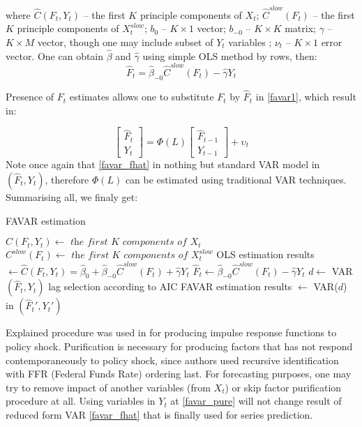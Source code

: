 \documentclass[a4paper, 14pt]{article}
\begin{document}
 \noindent where $\hat{C}(F_t, Y_t)$ -- the first $K$ principle components of $X_t$; $\hat{C}^{slow}(F_t)$ -- the first $K$ principle components of $X_t^{slow}$; $b_0$ -- $K \times 1$ vector; $b_{-0}$ -- $K \times K$ matrix; $\gamma$ -- $K \times M$ vector, though one may include subset of $Y_t$ variables  ; $\nu_t$ -- $K \times 1$ error vector. One can obtain $\hat{\beta}$ and $\hat{\gamma}$ using simple OLS method by rows, then: 
 \[\hat{F}_t = \hat{\beta}_{-0} \hat{C}^{slow}(F_t) - \hat{\gamma}Y_t      \]  
 
 \noindent Presence of $F_t$ estimates allows one to substitute $F_t$ by $\hat{F}_t$ in \eqref{favar1},  which result in:
 
 \begin{equation}\label{favar_fhat}
 	\begin{bmatrix}
 	\hat{F}_t \\
 	Y_t
 	\end{bmatrix} = \Phi (L) 
 	\begin{bmatrix}
 	\hat{F}_{t-1} \\
 	Y_{t-1}
 	\end{bmatrix} + \upsilon_t
 \end{equation}
 Note once again that \eqref{favar_fhat} in nothing but standard VAR model in $(\hat{F}_t, Y_t)$, therefore $\Phi(L)$ can be estimated using traditional VAR techniques. Summarising all, we finaly get:

\begin{algorithm}
	\caption{FAVAR estimation}
	$C(F_t,Y_t) \gets \textit{ the first K components of } X_t $ \newline
	$C^{slow}(F_t) \gets \textit{ the first K components of } X_t^{slow}$ \newline
	OLS estimation results $\gets \hat{C}(F_t, Y_t) = \hat{\beta}_0 + \hat{\beta}_{-0} \hat{C}^{slow}(F_t) + \hat{\gamma} Y_t$\newline
	$\hat{F}_t \gets \hat{\beta}_{-0} \hat{C}^{slow}(F_t) - \hat{\gamma}Y_t$\newline
	$d \gets$ VAR$(\hat{F}_t, Y_t)$ lag selection according to AIC\newline
	FAVAR estimation results $\gets$ VAR($d$) in $(\hat{F}_t', Y_t')$
\end{algorithm}

Explained procedure was used in \cite{bernanke2005measuring} for producing impulse response functions to policy shock. Purification is necessary for producing factors that has not respond contemporaneously to policy shock, since authors used recursive identification with FFR (Federal Funds Rate) ordering last. For forecasting purposes, one may try to remove impact of another variables (from $X_t$) or skip factor purification procedure at all. Using variables in $Y_t$ at \eqref{favar_pure} will not change result of reduced form VAR \eqref{favar_fhat} that is finally used for series prediction.
\end{document}
